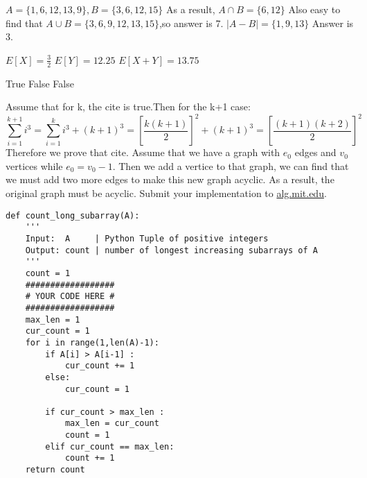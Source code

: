 \documentclass[12pt,twoside]{article}
\begin{document}

\begin{problems}

\problem  %

\begin{problemparts}
\problempart %
\(A=\{1,6,12,13,9\},B=\{3,6,12,15\}\)
As a result, $A\cap B=\{6,12\}$
\problempart %
Also easy to find that $A\cup B=\{3,6,9,12,13,15\}$,so answer is 7.
\problempart %
\(|A-B|=\{1,9,13\}\) Answer is 3.
\end{problemparts}

\problem  %

\begin{problemparts}
\problempart %
\(E[X]=\frac{3}{2}\)
\problempart %
\(E[Y]=12.25\)
\problempart %
\(E[X+Y]=13.75\)
\end{problemparts}

\problem  %

\begin{problemparts}
\problempart %
True
\problempart %
False
\problempart %
False
\end{problemparts}

\problem  %
Assume that for k, the cite is true.Then for the k+1 case:
\[\sum_{i=1}^{k+1}i^3=\sum_{i=1}^{k}i^3+(k+1)^3=[\frac{k(k+1)}{2}]^2+(k+1)^3=[\frac{(k+1)(k+2)}{2}]^2\]
Therefore we prove that cite.
\newpage
\problem  %
Assume that we have a graph with $e_0$ edges and $v_0$ vertices while $e_0=v_0-1$.
Then we add a vertice to that graph, we can find that we must add two more edges to make
this new graph acyclic. As a result, the original graph must be acyclic.
\vfill
\problem  %
Submit your implementation to {\small\url{alg.mit.edu}}.

\begin{lstlisting}
def count_long_subarray(A):
    '''
    Input:  A     | Python Tuple of positive integers
    Output: count | number of longest increasing subarrays of A
    '''
    count = 1
    ##################
    # YOUR CODE HERE #
    ##################
    max_len = 1
    cur_count = 1
    for i in range(1,len(A)-1):
        if A[i] > A[i-1] :
            cur_count += 1
        else:
            cur_count = 1

        if cur_count > max_len :
            max_len = cur_count
            count = 1
        elif cur_count == max_len:
            count += 1
    return count
\end{lstlisting}

\end{problems}
\end{document}
